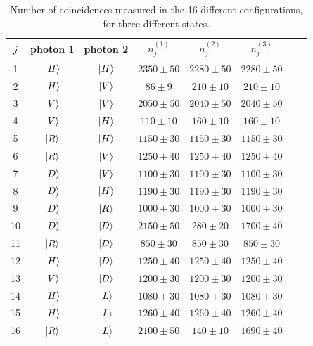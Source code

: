 \documentclass[a4paper, 11pt]{article}
\begin{document}
    \begin{table}[H]
      \centering
      \begin{tabular}{cccccccc}
        \toprule
        $j$ & photon 1 & photon 2 & $n_j^{(1)}$ & $n_j^{(2)}$ & $n_j^{(3)}$ \\
        \midrule
        1 & $\ket{H}$ & $\ket{H}$ & $2350 \pm 50$ & $2280 \pm 50$ & $2280 \pm 50$ \\
        2 & $\ket{H}$ & $\ket{V}$ & $86 \pm 9$ & $210 \pm 10$ & $210 \pm 10$ \\
        3 & $\ket{V}$ & $\ket{V}$ & $2050 \pm 50$ & $2040 \pm 50$ & $2040 \pm 50$ \\
        4 & $\ket{V}$ & $\ket{H}$ & $110 \pm 10$ & $160 \pm 10$ & $160 \pm 10$ \\
        \midrule
        5 & $\ket{R}$ & $\ket{H}$ & $1150 \pm 30$ & $1150 \pm 30$ & $1150 \pm 30$ \\
        6 & $\ket{R}$ & $\ket{V}$ & $1250 \pm 40$ & $1250 \pm 40$ & $1250 \pm 40$ \\
        7 & $\ket{D}$ & $\ket{V}$ & $1100 \pm 30$ & $1100 \pm 30$ & $1100 \pm 30$ \\
        8 & $\ket{D}$ & $\ket{H}$ & $1190 \pm 30$ & $1190 \pm 30$ & $1190 \pm 30$ \\
        9 & $\ket{D}$ & $\ket{R}$ & $1000 \pm 30$ & $1000 \pm 30$ & $1000 \pm 30$ \\
        10 & $\ket{D}$ & $\ket{D}$ & $2150 \pm 50$ & $280 \pm 20$ & $1700 \pm 40$ \\
        11 & $\ket{R}$ & $\ket{D}$ & $850 \pm 30$ & $850 \pm 30$ & $850 \pm 30$ \\
        12 & $\ket{H}$ & $\ket{D}$ & $1250 \pm 40$ & $1250 \pm 40$ & $1250 \pm 40$ \\
        13 & $\ket{V}$ & $\ket{D}$ & $1200 \pm 30$ & $1200 \pm 30$ & $1200 \pm 30$ \\
        14 & $\ket{H}$ & $\ket{L}$ & $1080 \pm 30$ & $1080 \pm 30$ & $1080 \pm 30$ \\
        15 & $\ket{H}$ & $\ket{L}$ & $1260 \pm 40$ & $1260 \pm 40$ & $1260 \pm 40$ \\
        16 & $\ket{R}$ & $\ket{L}$ & $2100 \pm 50$ & $140 \pm 10$ & $1690 \pm 40$ \\
        \bottomrule
      \end{tabular}
      \caption{Number of coincidences measured in the 16 different configurations, for three different states.}
      \label{tab:tomo_coinc}
    \end{table}
\end{document}
